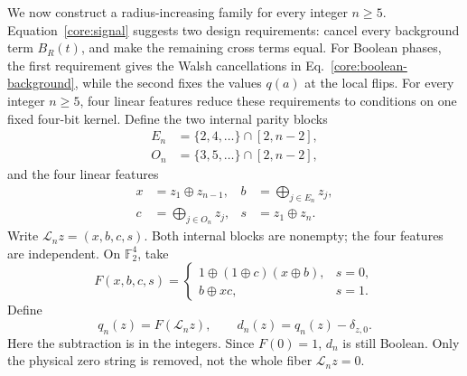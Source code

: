 We now construct a radius-increasing family for every integer $n\ge5$. Equation~\eqref{core:signal} suggests two design requirements: cancel every background term $B_R(t)$, and make the remaining cross terms equal. For Boolean phases, the first requirement gives the Walsh cancellations in Eq.~\eqref{core:boolean-background}, while the second fixes the values $q(a)$ at the local flips. For every integer $n\ge5$, four linear features reduce these requirements to conditions on one fixed four-bit kernel. Define the two internal parity blocks
\begin{equation}
 \begin{aligned}
 E_n&=\{2,4,\ldots\}\cap[2,n-2],\\
 O_n&=\{3,5,\ldots\}\cap[2,n-2],
 \end{aligned}
\end{equation}
and the four linear features
\begin{align}
 x&=z_1\oplus z_{n-1},& b&=\bigoplus_{j\in E_n}z_j,\nonumber\\
 c&=\bigoplus_{j\in O_n}z_j,& s&=z_1\oplus z_n.
 \label{core:features}
\end{align}
Write $\mathcal L_nz=(x,b,c,s)$. Both internal blocks are nonempty; the four features are independent. On $\mathbb F_2^4$, take
\begin{equation}
 F(x,b,c,s)=\begin{cases}
 1\oplus(1\oplus c)(x\oplus b),&s=0,\\
 b\oplus xc,&s=1.
 \end{cases}
 \label{core:kernel}
\end{equation}
Define
\begin{equation}
 q_n(z)=F(\mathcal L_nz),\qquad
 d_n(z)=q_n(z)-\delta_{z,0}.
 \label{core:support}
\end{equation}
Here the subtraction is in the integers. Since $F(0)=1$, $d_n$ is still Boolean. Only the physical zero string is removed, not the whole fiber $\mathcal L_nz=0$.

